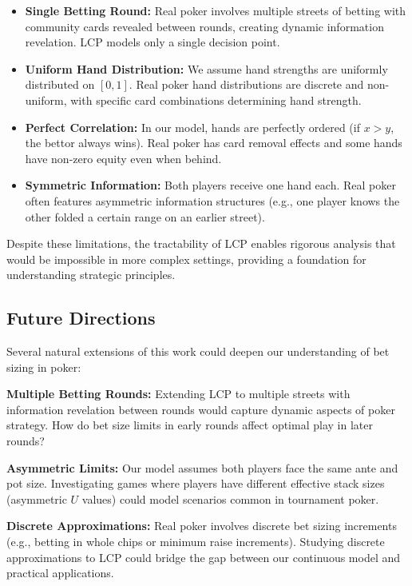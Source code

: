 \documentclass[../../main/main.tex]{subfiles}
\begin{document}
\begin{itemize}
    \item \textbf{Single Betting Round:} Real poker involves multiple streets of betting with community cards revealed between rounds, creating dynamic information revelation. LCP models only a single decision point.

    \item \textbf{Uniform Hand Distribution:} We assume hand strengths are uniformly distributed on $[0,1]$. Real poker hand distributions are discrete and non-uniform, with specific card combinations determining hand strength.

    \item \textbf{Perfect Correlation:} In our model, hands are perfectly ordered (if $x > y$, the bettor always wins). Real poker has card removal effects and some hands have non-zero equity even when behind.

    \item \textbf{Symmetric Information:} Both players receive one hand each. Real poker often features asymmetric information structures (e.g., one player knows the other folded a certain range on an earlier street).
\end{itemize}

Despite these limitations, the tractability of LCP enables rigorous analysis that would be impossible in more complex settings, providing a foundation for understanding strategic principles.

\subsection{Future Directions}

Several natural extensions of this work could deepen our understanding of bet sizing in poker:

\textbf{Multiple Betting Rounds:} Extending LCP to multiple streets with information revelation between rounds would capture dynamic aspects of poker strategy. How do bet size limits in early rounds affect optimal play in later rounds?

\textbf{Asymmetric Limits:} Our model assumes both players face the same ante and pot size. Investigating games where players have different effective stack sizes (asymmetric $U$ values) could model scenarios common in tournament poker.

\textbf{Discrete Approximations:} Real poker involves discrete bet sizing increments (e.g., betting in whole chips or minimum raise increments). Studying discrete approximations to LCP could bridge the gap between our continuous model and practical applications.
\end{document}
